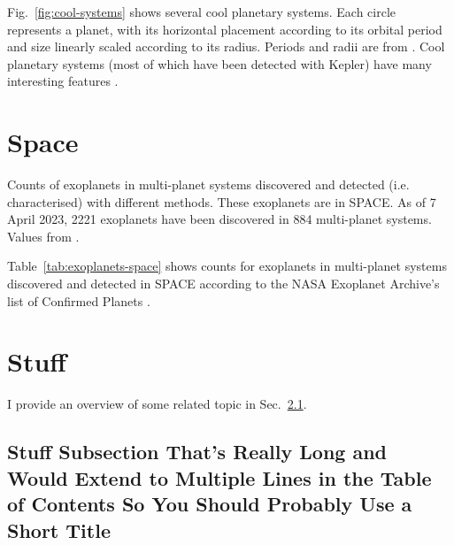 Fig.~\ref{fig:cool-systems} shows several cool planetary systems.
Each circle represents a planet, with its horizontal placement according to its orbital period and size linearly scaled according to its radius.
Periods and radii are from \citep{nasa-exoplanet-archive-2019}.
Cool planetary systems (most of which have been detected with Kepler) have many interesting features \citep[as reviewed in e.g.][]{2021ARA&A..59..291Z,2022arXiv220310076W}.


\section{Space}
\label{sec:intro-space}

\lipsum[4]

\begin{table}
  \centering
  \caption[Discovery and detection counts of observed exoplanets in multi-planet systems in SPACE]{Counts of exoplanets in multi-planet systems discovered and detected (i.e. characterised) with different methods. These exoplanets are in SPACE. As of 7 April 2023, 2221 exoplanets have been discovered in 884 multi-planet systems. Values from \citet{nasa-exoplanet-archive}.}
  
  \label{tab:exoplanets-space}
\end{table}

Table~\ref{tab:exoplanets-space} shows counts for exoplanets in multi-planet systems discovered and detected in SPACE according to the NASA Exoplanet Archive's list of Confirmed Planets \citep{nasa-exoplanet-archive}.


\section{Stuff}
\label{sec:intro-stuff}

I provide an overview of some related topic in Sec.~\ref{sec:intro-stuff-subsection}.


\subsection[Stuff Subsection]{Stuff Subsection That's Really Long and Would Extend to Multiple Lines in the Table of Contents So You Should Probably Use a Short Title}
\label{sec:intro-stuff-subsection}

